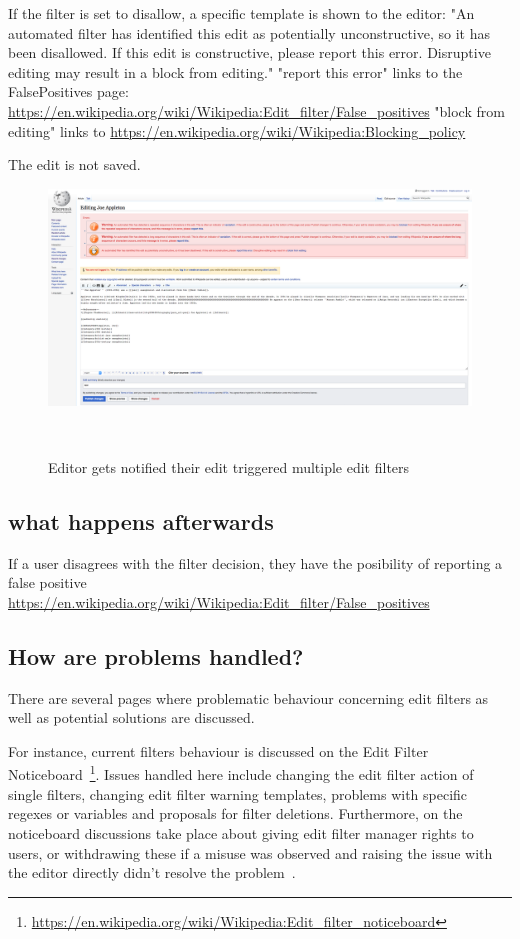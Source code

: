 If the filter is set to disallow, a specific template is shown to the editor: "An automated filter has identified this edit as potentially unconstructive, so it has been disallowed. If this edit is constructive, please report this error. Disruptive editing may result in a block from editing."
"report this error" links to the FalsePositives page: \url{https://en.wikipedia.org/wiki/Wikipedia:Edit_filter/False_positives}
"block from editing" links to \url{https://en.wikipedia.org/wiki/Wikipedia:Blocking_policy}

The edit is not saved.

\begin{figure}
\centering
  \includegraphics[width=0.9\columnwidth]{pics/screenshots-filter-trigger/Screenshot-trigger-warning-filter.png}
  \caption{Editor gets notified their edit triggered multiple edit filters}~\label{fig:screenshot-warn-disallow}
\end{figure}

\subsection{what happens afterwards}

If a user disagrees with the filter decision, they have the posibility of reporting a false positive
\url{https://en.wikipedia.org/wiki/Wikipedia:Edit_filter/False_positives}

\subsection{How are problems handled?}

There are several pages where problematic behaviour concerning edit filters as well as potential solutions are discussed.

For instance, current filters behaviour is discussed on the Edit Filter Noticeboard~\footnote{\url{https://en.wikipedia.org/wiki/Wikipedia:Edit_filter_noticeboard}}.
Issues handled here include changing the edit filter action of single filters, changing edit filter warning templates, problems with specific regexes or variables and proposals for filter deletions.
Furthermore, on the noticeboard discussions take place about giving edit filter manager rights to users, or withdrawing these if a misuse was observed and raising the issue with the editor directly didn't resolve the problem~\cite{Wikipedia:EditFilter}.

